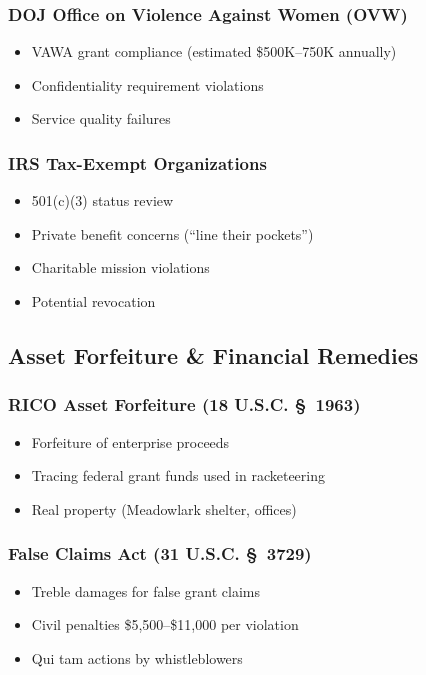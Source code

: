 \documentclass[11pt,letterpaper]{article}
\begin{document}
\subsubsection{DOJ Office on Violence Against Women (OVW)}
\begin{itemize}[leftmargin=*]
\item VAWA grant compliance (estimated \$500K--750K annually)
\item Confidentiality requirement violations
\item Service quality failures
\end{itemize}

\subsubsection{IRS Tax-Exempt Organizations}
\begin{itemize}[leftmargin=*]
\item 501(c)(3) status review
\item Private benefit concerns (``line their pockets'')
\item Charitable mission violations
\item Potential revocation
\end{itemize}

\subsection{Asset Forfeiture \& Financial Remedies}

\subsubsection{RICO Asset Forfeiture (18 U.S.C. \S~1963)}
\begin{itemize}[leftmargin=*]
\item Forfeiture of enterprise proceeds
\item Tracing federal grant funds used in racketeering
\item Real property (Meadowlark shelter, offices)
\end{itemize}

\subsubsection{False Claims Act (31 U.S.C. \S~3729)}
\begin{itemize}[leftmargin=*]
\item Treble damages for false grant claims
\item Civil penalties \$5,500--\$11,000 per violation
\item Qui tam actions by whistleblowers
\end{itemize}
\end{document}
